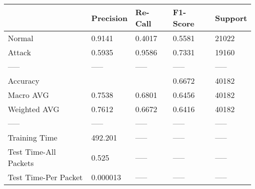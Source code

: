 \begin{tabular}{lllll}
\toprule
{} & Precision & Re-Call & F1-Score & Support \\
\midrule
Normal                &    0.9141 &  0.4017 &   0.5581 &   21022 \\
Attack                &    0.5935 &  0.9586 &   0.7331 &   19160 \\
-----                 &     ----- &   ----- &    ----- &   ----- \\
Accuracy              &           &         &   0.6672 &   40182 \\
Macro AVG             &    0.7538 &  0.6801 &   0.6456 &   40182 \\
Weighted AVG          &    0.7612 &  0.6672 &   0.6416 &   40182 \\
-----                 &     ----- &   ----- &    ----- &   ----- \\
Training Time         &   492.201 &   ----- &    ----- &   ----- \\
Test Time-All Packets &     0.525 &   ----- &    ----- &   ----- \\
Test Time-Per Packet  &  0.000013 &   ----- &    ----- &   ----- \\
\bottomrule
\end{tabular}
